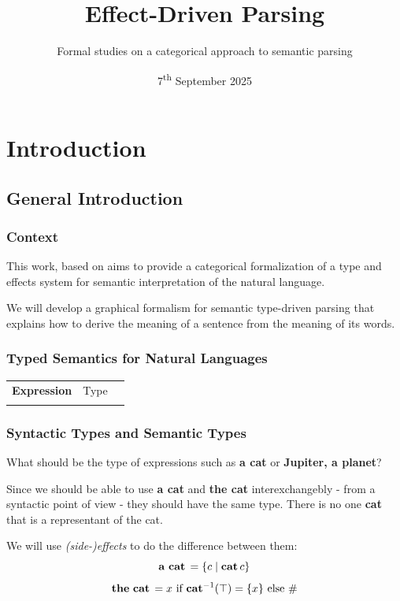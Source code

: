 \documentclass[math, english, info]{beamercours}
\title{Effect-Driven Parsing}
\subtitle{Formal studies on a categorical approach to semantic parsing}
\institute{École Normale Supérieure | Yale University}
\date{7\textsuperscript{th} September 2025}
\begin{document}
\fancytitleframe

\section{Introduction}
\subsection{General Introduction}
\begin{frame}
	\frametitle{Context}
	This work, based on \cite{bumfordEffectdrivenInterpretationFunctors2025} aims
	to provide a categorical formalization of a type and effects system for
	semantic interpretation of the natural language.

	\medskip

	We will develop a graphical formalism for semantic type-driven parsing that
	explains how to derive the meaning of a sentence from the meaning of its
	words.
\end{frame}

\begin{frame}[fragile]
	\frametitle{Typed Semantics for Natural Languages}
	\setcellgapes{3pt}
	\makegapedcells
	\begin{NiceTabular}{>{\bf}LLL}
		Expression & \rm Type & \lambda{} \\
		\CodeAfter
	\end{NiceTabular}
\end{frame}

\begin{frame}[fragile]
	\frametitle{Syntactic Types and Semantic Types}
	What should be the type of expressions such as \textbf{a cat} or \textbf{Jupiter, a planet}?
	\pause

	\smallskip

	Since we should be able to use \textbf{a cat} and \textbf{the cat} interexchangebly - from a syntactic point of view - they should have the same type.
	There is no one \textbf{cat} that is a representant of the cat.

	\pause

	We will use \emph{(side-)effects} to do the difference between them:
	\begin{equation*}
		\mathbf{a\ cat}\, = \{c \mid \mathbf{cat}\, c\}
	\end{equation*}
	\begin{equation*}
		\mathbf{the\ cat}\, = x \text{ if } \mathbf{cat}^{-1}(\top) = \{x\} \text{ else } \#
	\end{equation*}
\end{frame}
\end{document}
